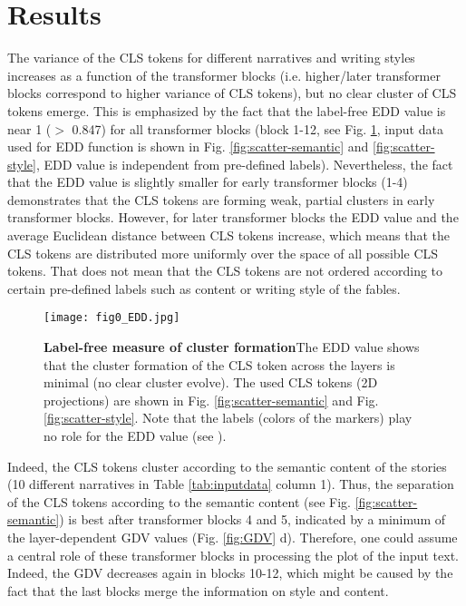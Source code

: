 \section*{Results}
The variance of the CLS tokens for different narratives and writing styles increases as a function of the transformer blocks (i.e. higher/later transformer blocks correspond to higher variance of CLS tokens), but no clear cluster of CLS tokens emerge. This is emphasized by the fact that the label-free EDD value \cite{metzner2023beyond} is near 1 ($>$ 0.847) for all transformer blocks (block 1-12, see Fig. \ref{fig:EDD}, input data used for EDD function is shown in Fig. \ref{fig:scatter-semantic} and \ref{fig:scatter-style}, EDD value is independent from pre-defined labels). Nevertheless, the fact that the EDD value is slightly smaller for early transformer blocks (1-4) demonstrates that the CLS tokens are forming weak, partial clusters in early transformer blocks. However, for later transformer blocks the EDD value and the average Euclidean distance between CLS tokens increase, which means that the CLS tokens are distributed more uniformly over the space of all possible CLS tokens. That does not mean that the CLS tokens are not ordered according to certain pre-defined labels such as content or writing style of the fables.  

\begin{figure}[h!]
    \centering
    \texttt{[image: fig0\_EDD.jpg]}
    \caption{\textbf{Label-free measure of cluster formation}\newline The EDD  value shows that the cluster formation of the CLS token across the layers is minimal (no clear cluster evolve). The used CLS tokens (2D projections) are shown in Fig. \ref{fig:scatter-semantic} and Fig. \ref{fig:scatter-style}. Note that the labels (colors of the markers) play no role for the EDD value (see \cite{metzner2023beyond}).}
    \label{fig:EDD}
\end{figure}

Indeed, the CLS tokens cluster according to the semantic content of the stories (10 different narratives in Table \ref{tab:inputdata} column 1). Thus, the  separation of the CLS tokens according to the semantic content (see Fig. \ref{fig:scatter-semantic}) is best after transformer blocks 4 and 5, indicated by a minimum of the layer-dependent GDV values (Fig. \ref{fig:GDV} d). Therefore, one could assume a central role of these transformer blocks in processing the plot of the input text. Indeed, the GDV decreases again in blocks 10-12, which might be caused by the fact that the last blocks merge the information on style and content.

